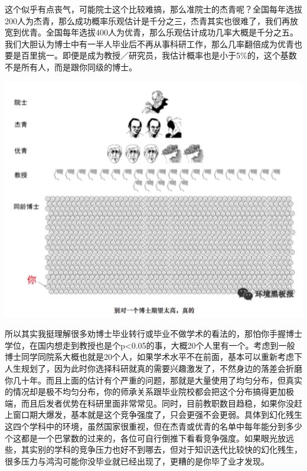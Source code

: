 \documentclass[
]{book}
\begin{document}
这个似乎有点丧气，可能院士这个比较难搞，那么准院士的杰青呢？全国每年选拔200人为杰青，那么成功概率乐观估计是千分之三，杰青其实也很难了，我们再放宽到优青。全国每年选拔400人为优青，那么乐观估计成功几率大概是千分之五。我们大胆认为博士中有一半人毕业后不再从事科研工作，那么几率翻倍成为优青也要是百里挑一。即便是成为教授／研究员，我估计概率也是小于5\%的，这个基数不是所有人，而是跟你同级的博士。

\includegraphics[width=6.67in]{images/hhcs3}

所以其实我挺理解很多劝博士毕业转行或毕业不做学术的看法的，那怕你手握博士学位，在国内想走到教授也是个p\textless0.05的事，大概20个人里有一个。考虑到一般博士同学同院系大概也就是20个人，如果学术水平不在前面，基本可以重新考虑下人生规划了，因为此时你选择科研就真的需要兴趣激发了，不然身边的落差会折磨你几十年。而且上面的估计有个严重的问题，那就是大量使用了均匀分布，但真实的情况却是极不均匀分布，你的师承关系跟毕业院校都会把这个分布搞得更加极端，而且后发者优势在科研里面非常常见。同时，目前教职数目趋稳，如果你没赶上窗口期大爆发，基本就是这个竞争强度了，只会更强不会更弱。具体到幻化残生这四个学科中的环境，虽然国家很重视，但在杰青或优青的名单中每年能分到多少个这都是一个巴掌数的过来的，各位可自行倒推下看看竞争强度。如果眼光放远些，其实别的学科的竞争压力也好不到哪去，但对于知识迭代比较快的幻化残生，很多压力与鸿沟可能你没毕业就已经出现了，更糟的是你毕了业才发现。
\end{document}
